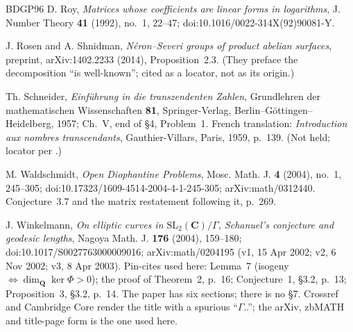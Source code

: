 \documentclass[11pt]{article}
\theoremstyle{definition}
\theoremstyle{remark}
\newcommand{\Q}{\mathbf{Q}}
\newcommand{\C}{\mathbf{C}}
\begin{document}
\begin{thebibliography}{BDGP96}
 D. Roy, \emph{Matrices whose coefficients are linear
forms in logarithms}, J. Number Theory \textbf{41} (1992), no.~1, 22--47;
doi:10.1016/0022-314X(92)90081-Y.

 J. Rosen and A. Shnidman, \emph{N\'eron--Severi groups of
product abelian surfaces}, preprint, arXiv:1402.2233 (2014), Proposition~2.3.
(They preface the decomposition ``is well-known''; cited as a locator, not as
its origin.)

 Th. Schneider, \emph{Einf\"uhrung in die transzendenten
Zahlen}, Grundlehren der mathematischen Wissenschaften \textbf{81},
Springer-Verlag, Berlin--G\"ottingen--Heidelberg, 1957; Ch.~V, end of \S4,
Problem~1. French translation: \emph{Introduction aux nombres transcendants},
Gauthier-Villars, Paris, 1959, p.~139. (Not held; locator per
\cite[\S3]{Wal04}.)

 M. Waldschmidt, \emph{Open Diophantine Problems},
Mosc. Math. J. \textbf{4} (2004), no.~1, 245--305;
doi:10.17323/1609-4514-2004-4-1-245-305; arXiv:math/0312440. Conjecture~3.7
and the matrix restatement following it, p.~269.

 J. Winkelmann, \emph{On elliptic curves in
$\mathrm{SL}_2(\C)/\Gamma$, Schanuel's conjecture and geodesic lengths},
Nagoya Math. J. \textbf{176} (2004), 159--180;
doi:10.1017/S0027763000009016; arXiv:math/0204195 (v1, 15 Apr 2002; v2,
6 Nov 2002; v3, 8 Apr 2003). Pin-cites used here: Lemma~7 (isogeny
$\Leftrightarrow \dim_\Q \ker \Phi > 0$); the proof of Theorem~2, p.~16;
Conjecture~1, \S3.2, p.~13; Proposition~3, \S3.2, p.~14. The paper has six
sections; there is no \S7. Crossref and Cambridge Core render the title with a
spurious ``$\Gamma$..''; the arXiv, zbMATH and title-page form is the one used
here.

\end{thebibliography}
\end{document}
